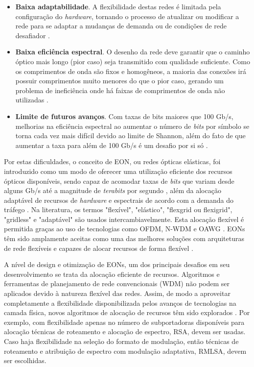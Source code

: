 \begin{itemize}
  \item \textbf{Baixa adaptabilidade}. A flexibilidade destas redes é limitada pela configuração do \textit{hardware}, tornando o processo de atualizar ou modificar a rede para se adaptar a mudanças de demanda ou de condições de rede desafiador \cite{eon_tutorial_2014}.
  \item \textbf{Baixa eficiência espectral}. O desenho da rede deve garantir que o caminho óptico mais longo (pior caso) seja transmitido com qualidade suficiente. Como os comprimentos de onda são fixos e homogêneos, a maioria das conexões irá possuir comprimentos muito menores do que o pior caso, gerando um problema de ineficiência onde há faixas de comprimentos de onda não utilizadas \cite{jinno_eon_benefits,vizcaino_eon_energy}.
  \item \textbf{Limite de futuros avanços}. Com taxas de bits maiores que 100 Gb/s, melhorias na eficiência espectral ao aumentar o número de \textit{bits} por símbolo se torna cada vez mais difícil devido ao limite de Shannon, além do fato de que aumentar a taxa para além de 100 Gb/s é um desafio por si só \cite{jinno_eon_benefits}.
\end{itemize}

Por estas dificuldades, o conceito de \acrfull{EON}, ou redes ópticas elásticas, foi introduzido como um modo de oferecer uma utilização eficiente dos recursos ópticos disponíveis, sendo capaz de acomodar taxas de \textit{bits} que variam desde alguns Gb/s até a magnitude de \textit{terabits} por segundo \cite{eon_tutorial_2014, eon_survey_2012}, além da alocação adaptável de recursos de \textit{hardware} e espectrais de acordo com a demanda do tráfego \cite{jinno_eon_benefits}. Na literatura, os termos "flexível", "elástico", "flexgrid ou flexigrid", "gridless" e "adaptável" são usados intercambiavelmente. Esta alocação flexível é permitida graças ao uso de tecnologias como \acrfull{OFDM}, \acrfull{N-WDM} e \acrfull{OAWG} \cite{eon_tutorial_2014}. EONs têm sido amplamente aceitas como uma das melhores soluções com arquiteturas de rede flexíveis e capazes de alocar recursos de forma flexível \cite{eon_ml_rsa_dl_2019}.

A nível de design e otimização de \acrfull{EONs}, um dos principais desafios em seu desenvolvimento se trata da alocação eficiente de recursos. Algoritmos e ferramentas de planejamento de rede convencionais (WDM) não podem ser aplicados devido à natureza flexível das redes. Assim, de modo a aproveitar completamente a flexibilidade disponibilizada pelos avanços de tecnologias na camada física, novos algoritmos de alocação de recursos têm sido explorados \cite{eon_tutorial_2014, eon_allocation_2011, eon_allocation_2011_2, eon_allocation_2016, eon_allocation_2017}. Por exemplo, com flexibilidade apenas no número de subportadoras disponíveis para alocação técnicas de roteamento e alocação de espectro, \acrfull{RSA}, devem ser usadas. Caso haja flexibilidade na seleção do formato de modulação, então técnicas de roteamento e atribuição de espectro com modulação adaptativa, \acrfull{RMLSA}, devem ser escolhidas.

